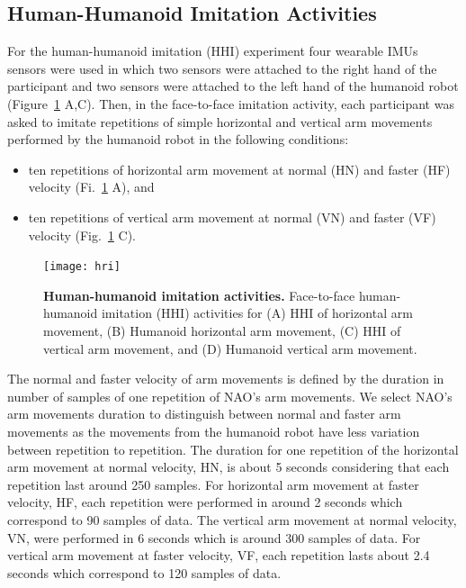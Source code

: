 \subsection{Human-Humanoid Imitation Activities} \label{sec:experiment:hhi}
For the human-humanoid imitation (HHI) experiment four wearable IMUs sensors 
were used in which two sensors were attached to the right hand of 
the participant and two sensors were attached to the left hand of 
the humanoid robot (Figure~\ref{fig:hri} A,C).
Then, in the face-to-face imitation activity, each participant was asked 
to imitate repetitions of simple horizontal and vertical arm movements 
performed by the humanoid robot in the following conditions:
\begin{itemize}[noitemsep,topsep=0pt]
\item ten repetitions of horizontal arm movement at normal (HN) and faster (HF) 
velocity (Fi.~\ref{fig:hri} A), and
\item ten repetitions of vertical arm movement at normal (VN) and faster (VF) 
velocity (Fig.~\ref{fig:hri} C).
\end{itemize}
\begin{figure}
  \centering
  \texttt{[image: hri]}
    \caption{
	{\bf Human-humanoid imitation activities.} 
		Face-to-face human-humanoid imitation (HHI) activities for 
		(A) HHI of horizontal arm movement, 
		(B) Humanoid horizontal arm movement,
		(C) HHI of vertical arm movement, and 
		(D) Humanoid vertical arm movement.
        }
    \label{fig:hri}
\end{figure}
The normal and faster velocity of arm movements is defined by the duration in 
number of samples of one repetition of NAO's arm movements.
We select NAO's arm movements duration to distinguish between normal and 
faster arm movements as the movements from the humanoid robot have less 
variation between repetition to repetition. 
The duration for one repetition of the horizontal 
arm movement at normal velocity, HN, is about 5 seconds considering that 
each repetition last around 250 samples. For horizontal arm movement at 
faster velocity, HF, each repetition were performed in around 2 seconds 
which correspond to 90 samples of data. 
The vertical arm movement at normal velocity, VN, were performed  in 6 seconds 
which is around 300 samples of data.
For vertical arm movement at faster velocity, VF, each repetition lasts 
about 2.4 seconds which correspond to 120 samples of data.
